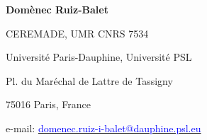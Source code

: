 \documentclass[a4paper,11pt]{article}
\theoremstyle{plain}
\numberwithin{equation}{section}
\begin{document}
\begin{center}
\begin{minipage}[t]{.5\textwidth}
  {\footnotesize{\bf Domènec Ruiz-Balet}\par
  CEREMADE, UMR CNRS 7534\par
  Université Paris-Dauphine, Université PSL\par
  Pl. du Maréchal de Lattre de Tassigny\par
  75016 Paris, France\par
 \par
  e-mail: \href{mailto:blank}{\textcolor{blue}{\scriptsize domenec.ruiz-i-balet@dauphine.psl.eu}}
  }
\end{minipage}%
\end{center}
\end{document}

